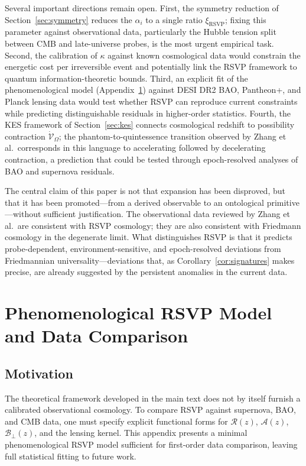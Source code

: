 \documentclass[12pt,a4paper]{article}
\theoremstyle{remark}
\newcommand{\Rcal}{\mathcal{R}}
\newcommand{\Acal}{\mathcal{A}}
\newcommand{\Bcal}{\mathcal{B}}
\begin{document}
Several important directions remain open. First, the symmetry reduction of Section~\ref{sec:symmetry} reduces the $\alpha_i$ to a single ratio $\xi_{\mathrm{RSVP}}$; fixing this parameter against observational data, particularly the Hubble tension split between CMB and late-universe probes, is the most urgent empirical task. Second, the calibration of $\kappa$ against known cosmological data would constrain the energetic cost per irreversible event and potentially link the RSVP framework to quantum information-theoretic bounds. Third, an explicit fit of the phenomenological model (Appendix~\ref{app:pheno}) against DESI DR2 BAO, Pantheon+, and Planck lensing data would test whether RSVP can reproduce current constraints while predicting distinguishable residuals in higher-order statistics. Fourth, the KES framework of Section~\ref{sec:kes} connects cosmological redshift to possibility contraction $\dot{\mathcal{V}}_\Omega$; the phantom-to-quintessence transition observed by Zhang et al.\ corresponds in this language to accelerating followed by decelerating contraction, a prediction that could be tested through epoch-resolved analyses of BAO and supernova residuals.

The central claim of this paper is not that expansion has been disproved, but that it has been promoted---from a derived observable to an ontological primitive---without sufficient justification. The observational data reviewed by Zhang et al.\ are consistent with RSVP cosmology; they are also consistent with Friedmann cosmology in the degenerate limit. What distinguishes RSVP is that it predicts probe-dependent, environment-sensitive, and epoch-resolved deviations from Friedmannian universality---deviations that, as Corollary~\ref{cor:signatures} makes precise, are already suggested by the persistent anomalies in the current data.



\appendix
\section{Phenomenological RSVP Model and Data Comparison}
\label{app:pheno}

\subsection{Motivation}

The theoretical framework developed in the main text does not by itself furnish
a calibrated observational cosmology. To compare RSVP against supernova,
BAO, and CMB data, one must specify explicit functional forms for
$\Rcal(z)$, $\Acal(z)$, $\Bcal_\perp(z)$, and the lensing kernel. This
appendix presents a minimal phenomenological RSVP model sufficient for
first-order data comparison, leaving full statistical fitting to future work.
\end{document}
